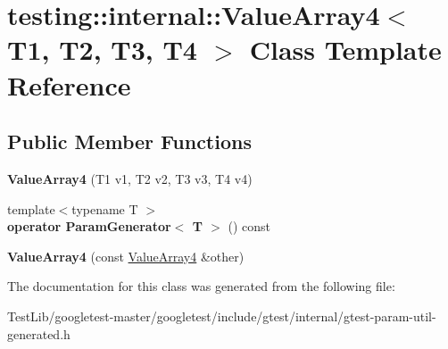 \hypertarget{classtesting_1_1internal_1_1ValueArray4}{}\section{testing\+:\+:internal\+:\+:Value\+Array4$<$ T1, T2, T3, T4 $>$ Class Template Reference}
\label{classtesting_1_1internal_1_1ValueArray4}
\subsection*{Public Member Functions}
\begin{DoxyCompactItemize}
\item 
\mbox{\label{classtesting_1_1internal_1_1ValueArray4_a5288bbb1a3149842ab13d689cf1fd48f}} 
{\bfseries Value\+Array4} (T1 v1, T2 v2, T3 v3, T4 v4)
\item 
\mbox{\label{classtesting_1_1internal_1_1ValueArray4_aef21f582b20423f5fb8515d9879ad557}} 
{\footnotesize template$<$typename T $>$ }\\{\bfseries operator Param\+Generator$<$ T $>$} () const
\item 
\mbox{\label{classtesting_1_1internal_1_1ValueArray4_a3703e95dc214c47d705cf68fdf2e262b}} 
{\bfseries Value\+Array4} (const \hyperlink{classtesting_1_1internal_1_1ValueArray4}{Value\+Array4} \&other)
\end{DoxyCompactItemize}


The documentation for this class was generated from the following file\+:\begin{DoxyCompactItemize}
\item 
Test\+Lib/googletest-\/master/googletest/include/gtest/internal/gtest-\/param-\/util-\/generated.\+h\end{DoxyCompactItemize}
